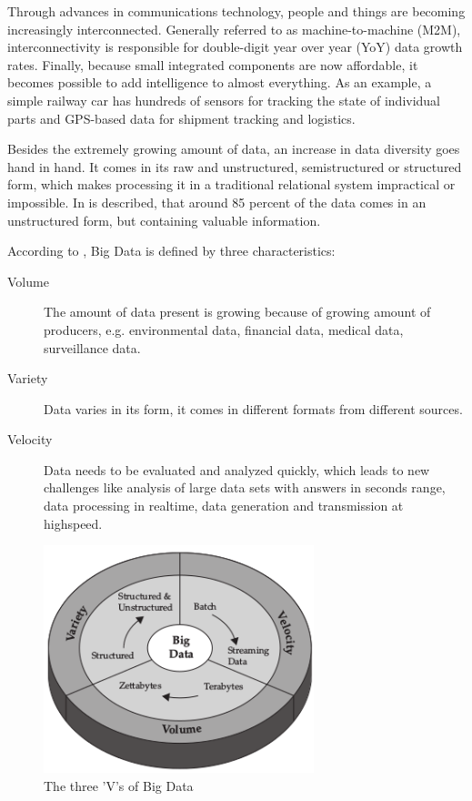 Through advances in communications technology, people and things are becoming increasingly interconnected.
Generally referred to as machine-to-machine (M2M), interconnectivity is responsible for double-digit year
over year (YoY) data growth rates. Finally, because small integrated components are now affordable, it
becomes possible to add intelligence to almost everything. As an example, a simple railway car has
hundreds of sensors for tracking the state of individual parts and GPS-based data for shipment tracking
and logistics.\cite{Ziko12}

Besides the extremely growing amount of data, an increase in data diversity goes hand in hand.
It comes in its raw and unstructured, semistructured or structured form, which makes processing it in a
traditional relational system impractical or impossible. In \cite{Bitk12} is described, that around
85 percent of the data comes in an unstructured form, but containing valuable information.

According to \cite{Marz15} \cite{Ziko12}, Big Data is defined by three characteristics:
\begin{description}
    \item [Volume] The amount of data present is growing because of growing amount of producers,
    e.g. environmental data, financial data, medical data, surveillance data.
    \item [Variety] Data varies in its form, it comes in different formats from different sources.
    \item [Velocity] Data needs to be evaluated and analyzed quickly, which leads to new challenges
    like analysis of large data sets with answers in seconds range, data processing in realtime,
    data generation and transmission at highspeed.
\end{description}
\begin{figure}[H]
	\centering
	\includegraphics[width=0.7\textwidth]{../images/03-three-vs-of-bigdata.png}
	\caption{The three 'V's of Big Data{\cite{Ziko12}}}
	\label{three-vs-of-bigdata}
\end{figure}

